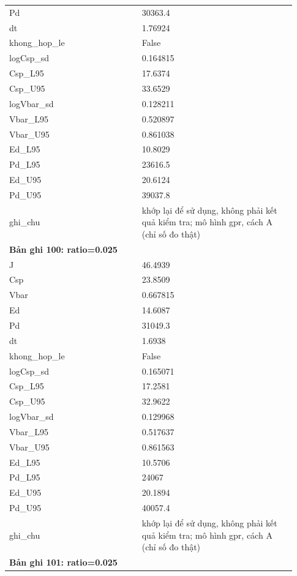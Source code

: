 \begin{longtable}{p{0.43\linewidth}p{0.50\linewidth}}
Pd & 30363.4 \\
dt & 1.76924 \\
khong\_\allowbreak hop\_\allowbreak le & False \\
logCsp\_\allowbreak sd & 0.164815 \\
Csp\_\allowbreak L95 & 17.6374 \\
Csp\_\allowbreak U95 & 33.6529 \\
logVbar\_\allowbreak sd & 0.128211 \\
Vbar\_\allowbreak L95 & 0.520897 \\
Vbar\_\allowbreak U95 & 0.861038 \\
Ed\_\allowbreak L95 & 10.8029 \\
Pd\_\allowbreak L95 & 23616.5 \\
Ed\_\allowbreak U95 & 20.6124 \\
Pd\_\allowbreak U95 & 39037.8 \\
ghi\_\allowbreak chu & khớp lại để sử dụng, không phải kết quả kiểm tra; mô hình gpr, cách A (chỉ số đo thật) \\
\midrule
\multicolumn{2}{p{0.95\linewidth}}{\textbf{Bản ghi 100: ratio=0.025}} \\
J & 46.4939 \\
Csp & 23.8509 \\
Vbar & 0.667815 \\
Ed & 14.6087 \\
Pd & 31049.3 \\
dt & 1.6938 \\
khong\_\allowbreak hop\_\allowbreak le & False \\
logCsp\_\allowbreak sd & 0.165071 \\
Csp\_\allowbreak L95 & 17.2581 \\
Csp\_\allowbreak U95 & 32.9622 \\
logVbar\_\allowbreak sd & 0.129968 \\
Vbar\_\allowbreak L95 & 0.517637 \\
Vbar\_\allowbreak U95 & 0.861563 \\
Ed\_\allowbreak L95 & 10.5706 \\
Pd\_\allowbreak L95 & 24067 \\
Ed\_\allowbreak U95 & 20.1894 \\
Pd\_\allowbreak U95 & 40057.4 \\
ghi\_\allowbreak chu & khớp lại để sử dụng, không phải kết quả kiểm tra; mô hình gpr, cách A (chỉ số đo thật) \\
\midrule
\multicolumn{2}{p{0.95\linewidth}}{\textbf{Bản ghi 101: ratio=0.025}} \\

\end{longtable}
